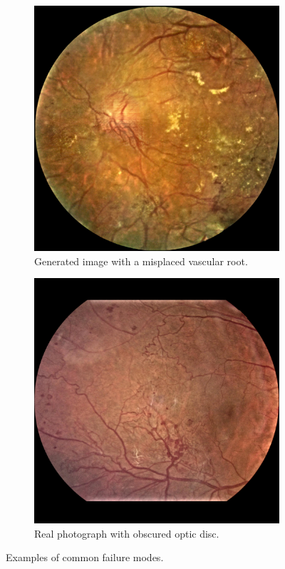 \begin{figure}[h]
    \centering
    \begin{subfigure}{0.40\textwidth}
        \centering
        \includegraphics[width=\linewidth]{retinas/figs/no-od.png}
        \caption{Generated image with a misplaced vascular root.}
        \label{fig:no_od}
    \end{subfigure}
    \begin{subfigure}{0.40\textwidth}
        \centering
        \includegraphics[width=\linewidth]{retinas/figs/no-od-real.png}
        \caption{Real photograph with obscured optic disc.}
        \label{fig:no_od_real}
    \end{subfigure}
    \caption{Examples of common failure modes.}
    \label{fig:spade_bad_sample}
\end{figure}

